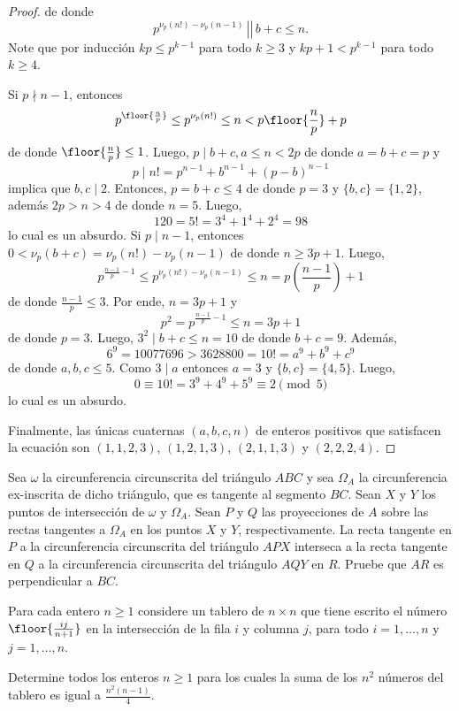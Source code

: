 \begin{proof}
	de donde
	\[\left.\left.p^{\nu_p(n!)-\nu_p(n-1)}\,\right\rvert\!\right\rvert\,b+c\le n.\]
	Note que por inducción $kp\le p^{k-1}$ para todo $k\ge 3$ y $kp+1<p^{k-1}$ para todo $k\ge 4$.
	\begin{itemize}
		\ii Si $p\nmid n-1$, entonces
		\[p^{\floor{\frac np}}\le p^{\nu_p(n!)}\le n<p\floor{\frac np}+p\]
		de donde $\floor{\frac np}\le 1$. Luego, $p\mid b+c,a\le n<2p$ de donde $a=b+c=p$ y
		\[p\mid n!=p^{n-1}+b^{n-1}+(p-b)^{n-1}\]
		implica que $b,c\mid 2$. Entonces, $p=b+c\le 4$ de donde $p=3$ y $\{b,c\}=\{1,2\}$, además $2p>n>4$ de donde $n=5$. Luego,
		\[120=5!=3^4+1^4+2^4=98\]
		lo cual es un absurdo.
		\ii Si $p\mid n-1$, entonces $0<\nu_p(b+c)=\nu_p(n!)-\nu_p(n-1)$ de donde $n\ge 3p+1$. Luego,
		\[p^{\frac{n-1}{p}-1}\le p^{\nu_p(n!)-\nu_p(n-1)}\le n=p\left(\frac{n-1}{p}\right)+1\]
		de donde $\frac{n-1}{p}\le 3$. Por ende, $n=3p+1$ y
		\[p^2=p^{\frac{n-1}{p}-1}\le n=3p+1\]
		de donde $p=3$. Luego, $3^2\mid b+c\le n=10$ de donde $b+c=9$. Además,
		\[6^9=10077696>3628800=10!=a^9+b^9+c^9\]
		de donde $a,b,c\le 5$. Como $3\mid a$ entonces $a=3$ y $\{b,c\}=\{4,5\}$. Luego,
		\[0\equiv 10!=3^9+4^9+5^9\equiv 2\pmod 5\]
		lo cual es un absurdo.
	\end{itemize}
	Finalmente, las únicas cuaternas $(a,b,c,n)$ de enteros positivos que satisfacen la ecuación son $(1,1,2,3)$, $(1,2,1,3)$, $(2,1,1,3)$ y $(2,2,2,4)$.
\end{proof}

\begin{probHR}
	Sea $\omega$ la circunferencia circunscrita del triángulo $ABC$ y sea $\Omega_A$ la circunferencia ex-inscrita de dicho triángulo, que es tangente al segmento $BC$. Sean $X$ y $Y$ los puntos de intersección de $\omega$ y $\Omega_A$. Sean $P$ y $Q$ las proyecciones de $A$ sobre las rectas tangentes a $\Omega_A$ en los puntos $X$ y $Y$, respectivamente. La recta tangente en $P$ a la circunferencia circunscrita del triángulo $APX$ interseca a la recta tangente en $Q$ a la circunferencia circunscrita del triángulo $AQY$ en $R$. Pruebe que $AR$ es perpendicular a $BC$.
\end{probHR}


\begin{probEG}
	Para cada entero $n\ge 1$ considere un tablero de $n\times n$ que tiene escrito el número $\floor{\frac{ij}{n+1}}$ en la intersección de la fila $i$ y columna $j$, para todo $i=1,\dots,n$ y $j=1,\dots,n$.

	Determine todos los enteros $n\ge 1$ para los cuales la suma de los $n^2$ números del tablero es igual a $\frac{n^2(n-1)}{4}$.
\end{probEG}

